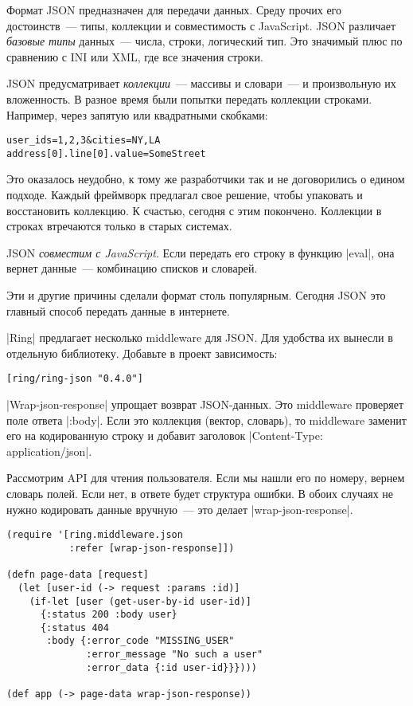 Формат JSON предназначен для передачи данных. Среду прочих его достоинств~---
типы, коллекции и совместимость с JavaScript. JSON различает \emph{базовые типы}
данных~--- числа, строки, логический тип. Это значимый плюс по сравнению с INI
или XML, где все значения строки.

JSON предусматривает \emph{коллекции}~--- массивы и словари~--- и произвольную их
вложенность. В разное время были попытки передать коллекции строками. Например,
через запятую или квадратными скобками:

\begin{verbatim}
user_ids=1,2,3&cities=NY,LA
address[0].line[0].value=SomeStreet
\end{verbatim}

\noindent
Это оказалось неудобно, к тому же разработчики так и не договорились о едином
подходе. Каждый фреймворк предлагал свое решение, чтобы упаковать и восстановить
коллекцию. К счастью, сегодня с этим покончено. Коллекции в строках втречаются
только в старых системах.

JSON \emph{совместим с JavaScript}. Если передать его строку в функцию
\spverb|eval|, она вернет данные~--- комбинацию списков и словарей.

Эти и другие причины сделали формат столь популярным. Сегодня JSON это главный
способ передать данные в интернете.

\spverb|Ring| предлагает несколько middleware для JSON. Для удобства их вынесли
в отдельную библиотеку. Добавьте в проект зависимость:

\begin{verbatim}
[ring/ring-json "0.4.0"]
\end{verbatim}

\spverb|Wrap-json-response| упрощает возврат JSON-данных. Это middleware
проверяет поле ответа \spverb|:body|. Если это коллекция (вектор, словарь), то
middleware заменит его на кодированную строку и добавит заголовок
\spverb|Content-Type: application/json|.

Рассмотрим API для чтения пользователя. Если мы нашли его по номеру, вернем
словарь полей. Если нет, в ответе будет структура ошибки. В обоих случаях не
нужно кодировать данные вручную~--- это делает \spverb|wrap-json-response|.

\begin{verbatim}
(require '[ring.middleware.json
           :refer [wrap-json-response]])

(defn page-data [request]
  (let [user-id (-> request :params :id)]
    (if-let [user (get-user-by-id user-id)]
      {:status 200 :body user}
      {:status 404
       :body {:error_code "MISSING_USER"
              :error_message "No such a user"
              :error_data {:id user-id}}})))

(def app (-> page-data wrap-json-response))
\end{verbatim}

